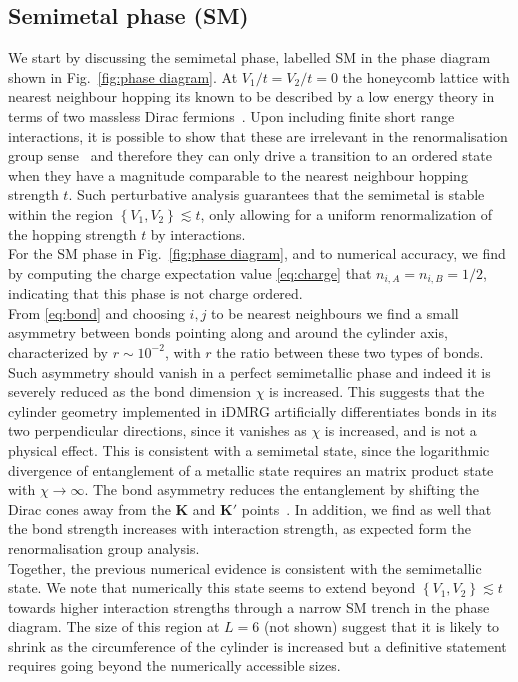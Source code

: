\documentclass[aps,prx,10pt,twocolumn,floatfix,superscriptaddress,showpacs,numerical,footinbib]{revtex4-1}
\begin{document}
%
\subsection{Semimetal phase (SM) \label{subsec:SM}}

%
We start by discussing the semimetal phase, labelled SM in the phase diagram shown in Fig.~\ref{fig:phase diagram}.
%
At $V_{1}/t=V_{2}/t=0$ the honeycomb lattice with nearest neighbour hopping its 
known to be described by a low energy theory in terms of two massless Dirac fermions~\cite{CastroNeto2009}.
%
Upon including finite short range interactions, it is possible to show that these are irrelevant in the renormalisation group sense~\cite{S94,KUP12} 
and therefore they can only drive a transition to an ordered state when they have a magnitude comparable to the nearest neighbour hopping strength $t$.
%
Such perturbative analysis guarantees that the semimetal is stable within
the region $\left\lbrace V_{1},V_{2}\right\rbrace \lesssim t$, only allowing for a uniform renormalization 
of the hopping strength $t$ by interactions.\\

%
For the SM phase in Fig.~\ref{fig:phase diagram}, and to numerical accuracy, we find by computing the charge expectation value
\eqref{eq:charge} that $n_{i,A}=n_{i,B}=1/2$, indicating that this phase is not charge ordered.\\
%
From \eqref{eq:bond} and choosing $i,j$ to be nearest neighbours we find
a small asymmetry between bonds pointing along and around the cylinder axis,
characterized by $r\sim10^{-2}$, with $r$ the ratio between these two types of bonds.
%
Such asymmetry should vanish in a perfect semimetallic phase and indeed it is severely reduced as the bond dimension $\chi$ is increased.
% 
This suggests that the cylinder geometry implemented in iDMRG artificially differentiates bonds in its two perpendicular directions,
since it vanishes as $\chi$ is increased, and is not a physical effect.
%
This is consistent with a semimetal state, since the logarithmic divergence of entanglement of a metallic state requires an matrix product state with $\chi\to\infty$. 
%
The bond asymmetry reduces the entanglement by shifting the Dirac cones away from the $\mathbf{K}$ and $\mathbf{K'}$ points~\cite{ACJ15}.
%
In addition, we find as well that the bond strength increases with interaction strength, as expected form the renormalisation group analysis. \\
%
Together, the previous numerical evidence is consistent with the semimetallic state.
%
We note that numerically this state seems to extend beyond $\left\lbrace V_{1},V_{2}\right\rbrace \lesssim t$ towards
higher interaction strengths through a narrow SM trench in the phase diagram.
%
The size of this region at $L=6$ (not shown) suggest that it is likely to shrink as the circumference of the cylinder is increased but
a definitive statement requires going beyond the numerically accessible sizes. 
%
\end{document}
